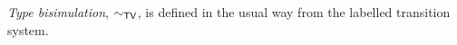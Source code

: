 \emph{Type bisimulation}, $\sim_{\mathsf{TV}}$, is defined in the usual way from the
labelled transition system.


